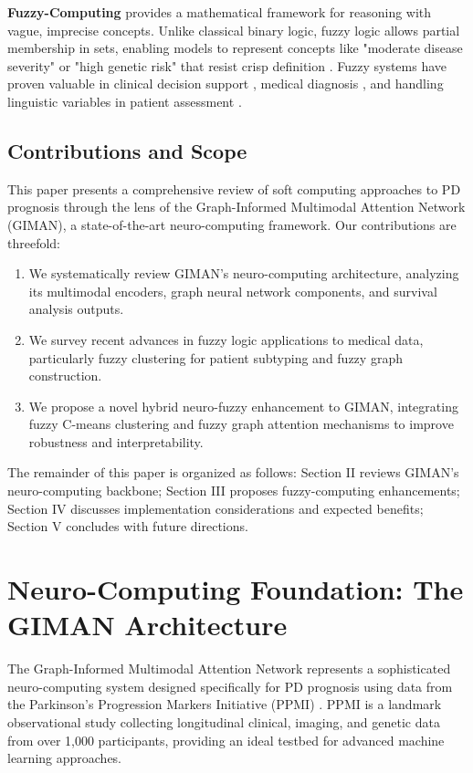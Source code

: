 \documentclass[conference]{IEEEtran}
\begin{document}
\textbf{Fuzzy-Computing} provides a mathematical framework for reasoning with vague, imprecise concepts. Unlike classical binary logic, fuzzy logic allows partial membership in sets, enabling models to represent concepts like "moderate disease severity" or "high genetic risk" that resist crisp definition \cite{zadeh1965fuzzy}. Fuzzy systems have proven valuable in clinical decision support \cite{pota2013fuzzy}, medical diagnosis \cite{adeli2010fuzzy}, and handling linguistic variables in patient assessment \cite{torres2006fuzzy}.

\subsection{Contributions and Scope}
This paper presents a comprehensive review of soft computing approaches to PD prognosis through the lens of the Graph-Informed Multimodal Attention Network (GIMAN), a state-of-the-art neuro-computing framework. Our contributions are threefold:

\begin{enumerate}
    \item We systematically review GIMAN's neuro-computing architecture, analyzing its multimodal encoders, graph neural network components, and survival analysis outputs.
    \item We survey recent advances in fuzzy logic applications to medical data, particularly fuzzy clustering for patient subtyping and fuzzy graph construction.
    \item We propose a novel hybrid neuro-fuzzy enhancement to GIMAN, integrating fuzzy C-means clustering and fuzzy graph attention mechanisms to improve robustness and interpretability.
\end{enumerate}

The remainder of this paper is organized as follows: Section II reviews GIMAN's neuro-computing backbone; Section III proposes fuzzy-computing enhancements; Section IV discusses implementation considerations and expected benefits; Section V concludes with future directions.

\section{Neuro-Computing Foundation: The GIMAN Architecture}

The Graph-Informed Multimodal Attention Network represents a sophisticated neuro-computing system designed specifically for PD prognosis using data from the Parkinson's Progression Markers Initiative (PPMI) \cite{marek2011ppmi}. PPMI is a landmark observational study collecting longitudinal clinical, imaging, and genetic data from over 1,000 participants, providing an ideal testbed for advanced machine learning approaches.
\end{document}
